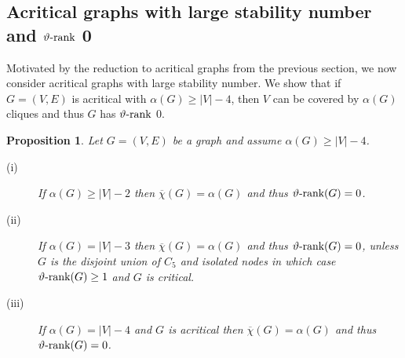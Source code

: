 \documentclass[11pt]{article}
\newtheorem{proposition}[theorem]{Proposition}
\numberwithin{equation}{section}
\newcommand{\rrank}{\vartheta\text{\rm -rank}}
\begin{document}
\subsection{Acritical graphs with large stability number and $\rrank$ 0}\label{sec-large-alpha}

Motivated by the reduction to acritical graphs from  the previous section, we now consider   acritical graphs with large stability number. We show that if $G=(V,E)$ is acritical with  $\alpha(G)\ge |V|-4$,  then $V$ can be covered by $\alpha(G)$ cliques and thus $G$ has $\rrank$ 0. 
\begin{proposition}\label{prop-alpha-large}
Let $G=(V,E)$ be a graph and assume $\alpha(G)\ge |V|-4$. \begin{description}
\item[(i)] If $\alpha(G)\ge |V|-2$ then $\overline \chi(G)=\alpha(G)$ and thus $\rrank (G)=0$.
\item[(ii)] If $\alpha(G)=|V|-3$ then $\overline \chi(G)=\alpha(G)$ and thus $\rrank(G)=0$, unless $G$ is the disjoint union of $C_5$ and isolated nodes in which case $\rrank (G)\ge 1$ and $G$ is critical.
\item[(iii)] If $\alpha(G)=|V|-4$ and $G$ is acritical then $\overline \chi(G)=\alpha(G)$ and thus $\rrank(G)=0$. 
\end{description}
\end{proposition}
\end{document}
